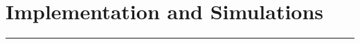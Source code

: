 \pagebreak
\section{Implementation and Simulations}\label{section3}
\noindent\rule{\textwidth}{1pt}

\begin{multicols}{2}
    
    
    \columnbreak
    
    
\end{multicols}
